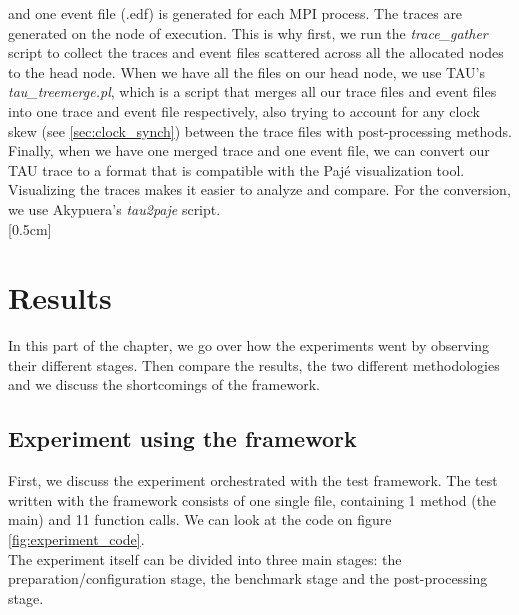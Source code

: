 and one event file (.edf) is generated for each MPI process. The
traces are generated on the node of execution. This is why first,
we run the \emph{trace\_gather}\cite{ms11} script to collect the traces
and event files scattered across all the allocated nodes to the head
node. When we have all the files on our head node, we use
TAU's \emph{tau\_treemerge.pl}, which is a script that merges all our
trace files and event files into one trace and event file
respectively, also trying to account for any clock skew
(see \ref{sec:clock_synch}) between the trace files with
post-processing methods. Finally, when we have one merged trace and
one event file, we can convert our TAU trace to a format that is
compatible with the Pajé\cite{cob00} visualization tool. Visualizing
the traces makes it easier to analyze and compare. For the conversion,
we use Akypuera's\cite{s13} \emph{tau2paje} script.\\[0.3cm][0.5cm]

\section{Results}
In this part of the chapter, we go over how the experiments went by
observing their different stages. Then compare the results, the
two different methodologies and we discuss the shortcomings of the
framework.
\subsection{Experiment using the framework}
First, we discuss the experiment orchestrated with the test
framework. The test written with the framework consists of one single
file, containing 1 method (the main) and 11 function calls. We can
look at the code on figure \ref{fig:experiment_code}.\\[0.3cm]
The experiment itself can be divided into three main stages: the
preparation/configuration stage, the benchmark stage and the
post-processing stage.

